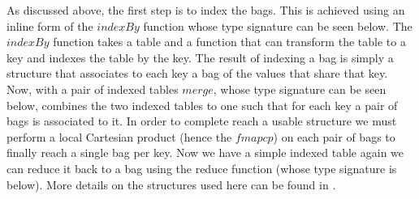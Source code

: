 As discussed above, the first step is to index the bags. This is achieved using
an inline form of the $indexBy$ function whose type
signature can be seen below. The $indexBy$ function
takes a table and a function that can transform the table to a key and indexes
the table by the key. The result of indexing a bag is simply a structure that
associates to each key a bag of the values that share that key. Now, with a pair of indexed tables
$merge$, whose type signature can be seen below,
combines the two indexed tables to one such that for each key a pair of bags is
associated to it. In order to complete reach a usable structure we must perform
a local Cartesian product (hence the $fmap cp$) on
each pair of bags to finally reach a single bag per key. Now we have a simple
indexed table again we can reduce it back to a bag using the reduce function
(whose type signature is below). More details on the structures used here can be
found in .


